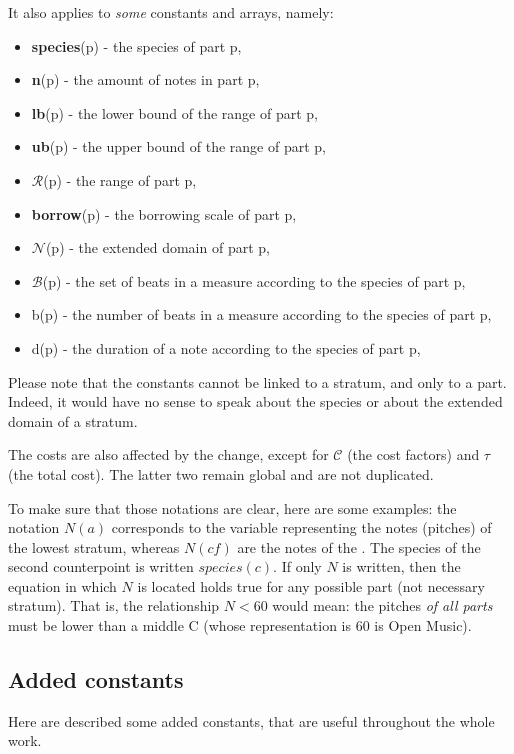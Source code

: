 \noindent It also applies to \textit{some} constants and arrays, namely:
\begin{itemize}
    \item \textbf{species}(p) - the species of part p,
    \item \textbf{n}(p) - the amount of notes in part p,
    \item \textbf{lb}(p) - the lower bound of the range of part p,
    \item \textbf{ub}(p) - the upper bound of the range of part p,
    \item $\mathcal{R}$(p) - the range of part p,
    \item \textbf{borrow}(p) - the borrowing scale of part p,
    \item $\mathcal{N}$(p) - the extended domain of part p,
    \item $\mathcal{B}$(p) - the set of beats in a measure according to the species of part p,
    \item b(p) - the number of beats in a measure according to the species of part p,
    \item d(p) - the duration of a note according to the species of part p,
\end{itemize}
Please note that the constants cannot be linked to a stratum, and only to a part. Indeed, it would have no sense to speak about the species or about the extended domain of a stratum.

The costs are also affected by the change, except for $\mathcal{C}$ (the cost factors) and $\tau$ (the total cost). The latter two remain global and are not duplicated.


To make sure that those notations are clear, here are some examples: the notation $N(a)$ corresponds to the variable representing the notes (pitches) of the lowest stratum, whereas $N(cf)$ are the notes of the \cf. The species of the second counterpoint is written $species(c)$. If only $N$ is written, then the equation in which $N$ is located holds true for any possible part (not necessary stratum). That is, the relationship $N < 60$ would mean: the pitches \textit{of all parts} must be lower than a middle C (whose representation is 60 is Open Music).

\subsection{Added constants}
Here are described some added constants, that are useful throughout the whole work.

